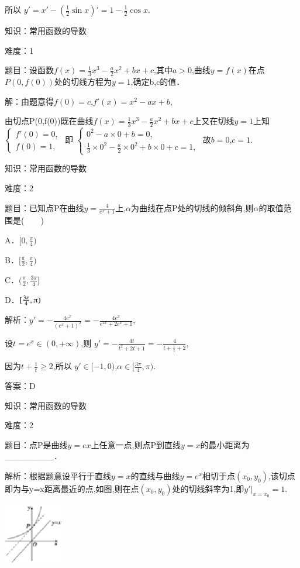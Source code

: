 \documentclass{article} %
\begin{document}
所以 $y'=x'-(\frac{1}{2}\sin x)'=1-\frac{1}{2}\cos x$.


知识：常用函数的导数

难度：1

题目：设函数$f(x)=\frac{1}{3}x^{3}-\frac{a}{2}x^{2}+bx+c$,其中$a>0$,曲线$y=f(x)$在点$P(0,f(0))$处的切线方程为$y=1$,确定b,c的值．

解：由题意得$f(0)=c$,$f'(x)=x^{2}-ax+b$,

由切点P(0,f(0))既在曲线$f(x)=\frac{1}{3}x^{3}-\frac{a}{2}x^{2}+bx+c$上又在切线$y=1$上知
$
\begin{cases}
f'(0)=0,\\
f(0)=1,
\end{cases}$
即
$
\begin{cases}
0^2-a\times 0+b=0,\\
\frac{1}{3}\times 0^2-\frac{a}{2}\times 0^2+b\times 0+c=1,
\end{cases}$
故$b=0$,$c=1$.



知识：常用函数的导数

难度：2

题目：已知点P在曲线$y=\frac{4}{e^x+1}$上,$\alpha$为曲线在点P处的切线的倾斜角,则$\alpha$的取值范围是(　　)

A．$[0,\frac{\pi}{4}) $  

B．$[\frac{\pi}{2},\frac{\pi}{4})$

C．$(\frac{\pi}{2},\frac{3\pi}{4}]$   

D．$[\frac{3\pi}{4},\piup)$

解析：$y'=-\frac{4e^x}{{(e^x+1)}^2}=-\frac{4e^x}{e^{2x}+2e^x+1}$,

设$t=e^{x}\in (0,+\infty)$,则
$y'=-\frac{4t}{t^2+2t+1}=-\frac{4}{t+\frac{1}{t}+2}$,

因为$t+\frac{1}{t} \ge2$,所以 $y'\in [-1,0)$,$\alpha \in[\frac{3\pi}{4},\pi)$.

答案：D



知识：常用函数的导数

难度：2

题目：点P是曲线$y=ex$上任意一点,则点P到直线$y=x$的最小距离为\_\_\_\_\_\_\_\_．

解析：根据题意设平行于直线$y=x$的直线与曲线$y=e^{x}$相切于点$(x_{0},y_{0})$,该切点即为与y=x距离最近的点,如图,则在点$(x_{0},y_{0})$处的切线斜率为1,即$y'|_{x=x_0}=1$.

\includegraphics*[width=1.02in, height=1.03in, keepaspectratio=false]{image49}
\end{document}
